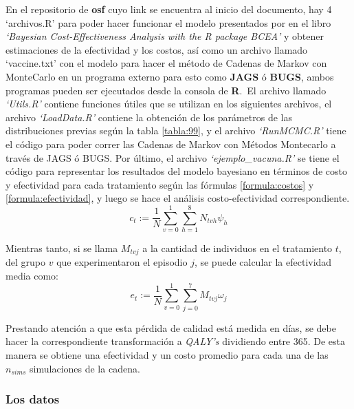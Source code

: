 \documentclass[12pt]{article}
\begin{document}
En el repositorio de \textbf{osf} cuyo link se encuentra al inicio del documento, hay 4 `archivos.R' para poder hacer funcionar el modelo presentados por \cite{baio_bayesian_2017} en el libro \textit{`Bayesian Cost-Effectiveness Analysis with the R package BCEA'} y obtener estimaciones de la efectividad y los costos, así como un archivo llamado `vaccine.txt' con el modelo para hacer el método de Cadenas de Markov con MonteCarlo en un programa externo para esto como \textbf{JAGS} ó \textbf{BUGS}, ambos programas pueden ser ejecutados desde la consola de \textbf{R}.\
El archivo llamado \textit{`Utils.R'} contiene funciones útiles que se utilizan en los siguientes archivos, el archivo \textit{`LoadData.R'} contiene la obtención de los parámetros de las distribuciones previas según la tabla \ref{tabla:99}, y el archivo \textit{`RunMCMC.R'} tiene el código para poder correr las Cadenas de Markov con Métodos Montecarlo a través de JAGS ó BUGS. Por último, el archivo \textit{`ejemplo\_vacuna.R'} se tiene el código para representar los resultados del modelo bayesiano en términos de costo y efectividad para cada tratamiento según las fórmulas \ref{formula:costos} y \ref{formula:efectividad}, y luego se hace el análisis costo-efectividad correspondiente.\\


\begin{equation}
    c_{t}:= \frac{1}{N}\sum_{v=0}^1 \sum_{h=1}^8 N_{tvh}\psi_h
\label{formula:costos}
\end{equation}

Mientras tanto, si se llama $M_{tvj}$ a la cantidad de individuos en el tratamiento $t$, del grupo $v$ que experimentaron el episodio $j$, se puede calcular la efectividad media como:\\

\begin{equation}
    e_t := \frac{1}{N} \sum_{v=0}^1 \sum_{j=0}^7 M_{tvj}\omega_j
\label{formula:efectividad}
\end{equation}

Prestando atención a que esta pérdida de calidad está medida en días, se debe hacer la correspondiente transformación a \textit{QALY's} dividiendo entre 365. De esta manera se obtiene una efectividad y un costo promedio para cada una de las $n_{sims}$ simulaciones de la cadena.


\subsubsection{Los datos}
\end{document}
